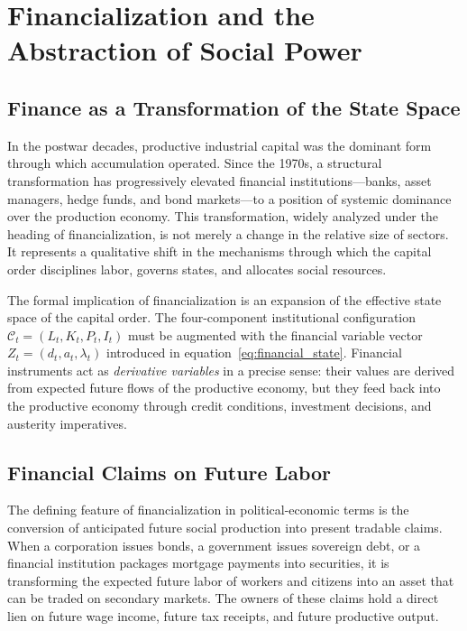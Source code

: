 \documentclass[12pt,a4paper]{article}
\theoremstyle{definition}
\theoremstyle{remark}
\begin{document}
\section{Financialization and the Abstraction of Social Power}
\label{sec:finance}

\subsection{Finance as a Transformation of the State Space}

In the postwar decades, productive industrial capital was the dominant form through which accumulation operated. Since the 1970s, a structural transformation has progressively elevated financial institutions---banks, asset managers, hedge funds, and bond markets---to a position of systemic dominance over the production economy. This transformation, widely analyzed under the heading of financialization, is not merely a change in the relative size of sectors. It represents a qualitative shift in the mechanisms through which the capital order disciplines labor, governs states, and allocates social resources.

The formal implication of financialization is an expansion of the effective state space of the capital order. The four-component institutional configuration $\mathcal{C}_t = (L_t, K_t, P_t, I_t)$ must be augmented with the financial variable vector $Z_t = (d_t, a_t, \lambda_t)$ introduced in equation~\eqref{eq:financial_state}. Financial instruments act as \emph{derivative variables} in a precise sense: their values are derived from expected future flows of the productive economy, but they feed back into the productive economy through credit conditions, investment decisions, and austerity imperatives.

\subsection{Financial Claims on Future Labor}

The defining feature of financialization in political-economic terms is the conversion of anticipated future social production into present tradable claims. When a corporation issues bonds, a government issues sovereign debt, or a financial institution packages mortgage payments into securities, it is transforming the expected future labor of workers and citizens into an asset that can be traded on secondary markets. The owners of these claims hold a direct lien on future wage income, future tax receipts, and future productive output.
\end{document}
